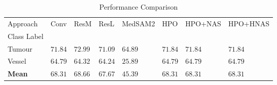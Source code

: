 \begin{table}
\caption{Performance Comparison}
\label{tab:results}
\begin{tabular}{llllllll}
\toprule
Approach & Conv & ResM & ResL & MedSAM2 & HPO & HPO+NAS & HPO+HNAS \\
Class Label &  &  &  &  &  &  &  \\
\midrule
Tumour & $71.84$ & $\mathbf{72.99}$ & $71.09$ & $64.89$ & $71.84$ & $71.84$ & $71.84$ \\
Vessel & $\mathbf{64.79}$ & $64.32$ & $64.24$ & $25.89$ & $64.79$ & $64.79$ & $64.79$ \\
\textbf{Mean} & $68.31$ & $\mathbf{68.66}$ & $67.67$ & $45.39$ & $68.31$ & $68.31$ & $68.31$ \\
\bottomrule
\end{tabular}
\end{table}
